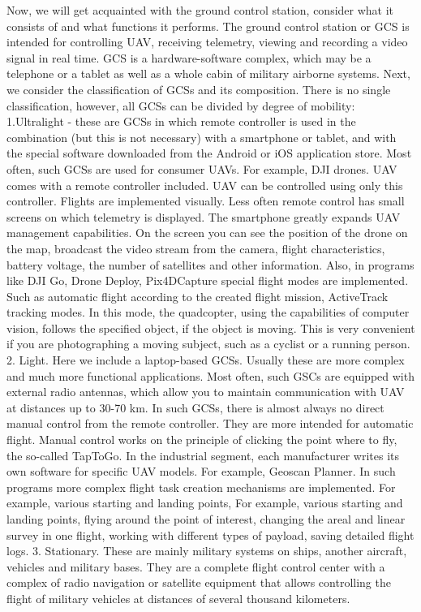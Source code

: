 \documentclass[
  letterpaper,
  DIV=11,
  numbers=noendperiod]{scrreprt}
\begin{document}
Now, we will get acquainted with the ground control station, consider
what it consists of and what functions it performs. The ground control
station or GCS is intended for controlling UAV, receiving telemetry,
viewing and recording a video signal in real time. GCS is a
hardware-software complex, which may be a telephone or a tablet as well
as a whole cabin of military airborne systems. Next, we consider the
classification of GCSs and its composition. There is no single
classification, however, all GCSs can be divided by degree of mobility:
1.Ultralight - these are GCSs in which remote controller is used in the
combination (but this is not necessary) with a smartphone or tablet, and
with the special software downloaded from the Android or iOS application
store. Most often, such GCSs are used for consumer UAVs. For example,
DJI drones. UAV comes with a remote controller included. UAV can be
controlled using only this controller. Flights are implemented visually.
Less often remote control has small screens on which telemetry is
displayed. The smartphone greatly expands UAV management capabilities.
On the screen you can see the position of the drone on the map,
broadcast the video stream from the camera, flight characteristics,
battery voltage, the number of satellites and other information. Also,
in programs like DJI Go, Drone Deploy, Pix4DCapture special flight modes
are implemented. Such as automatic flight according to the created
flight mission, ActiveTrack tracking modes. In this mode, the
quadcopter, using the capabilities of computer vision, follows the
specified object, if the object is moving. This is very convenient if
you are photographing a moving subject, such as a cyclist or a running
person. 2. Light. Here we include a laptop-based GCSs. Usually these are
more complex and much more functional applications. Most often, such
GSCs are equipped with external radio antennas, which allow you to
maintain communication with UAV at distances up to 30-70 km. In such
GCSs, there is almost always no direct manual control from the remote
controller. They are more intended for automatic flight. Manual control
works on the principle of clicking the point where to fly, the so-called
TapToGo. In the industrial segment, each manufacturer writes its own
software for specific UAV models. For example, Geoscan Planner. In such
programs more complex flight task creation mechanisms are implemented.
For example, various starting and landing points, For example, various
starting and landing points, flying around the point of interest,
changing the areal and linear survey in one flight, working with
different types of payload, saving detailed flight logs. 3. Stationary.
These are mainly military systems on ships, another aircraft, vehicles
and military bases. They are a complete flight control center with a
complex of radio navigation or satellite equipment that allows
controlling the flight of military vehicles at distances of several
thousand kilometers.
\end{document}
